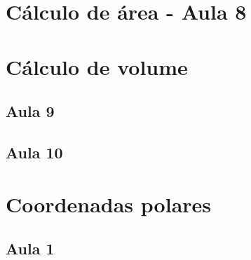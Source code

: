 \documentclass[12pt, a4paper]{article}
\begin{document}
		\section{Cálculo de área - Aula 8}
					
		\section{Cálculo de volume}
			\subsection{Aula 9}
						
			\subsection{Aula 10}
					
		\section{Coordenadas polares}		
			\subsection{Aula 1}
				
			
			
			
	
		
		
		
\end{document}
